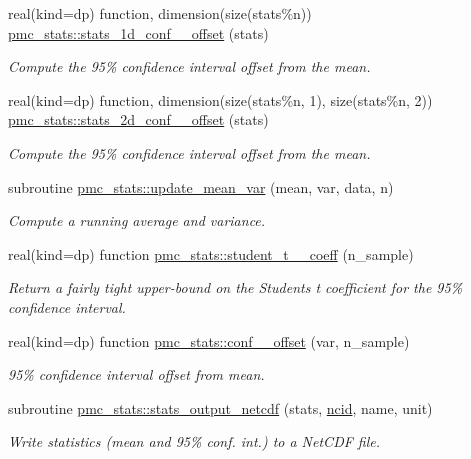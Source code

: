 \begin{DoxyCompactItemize}
real(kind=dp) function, dimension(size(stats\%n)) \mbox{\hyperlink{namespacepmc__stats_abb0f22506fbe1564d5dfe9b348967e3f}{pmc\+\_\+stats\+::stats\+\_\+1d\+\_\+conf\+\_\+\_\+offset}} (stats)
\begin{DoxyCompactList}\small\item\em Compute the 95\% confidence interval offset from the mean. \end{DoxyCompactList}\item 
real(kind=dp) function, dimension(size(stats\%n, 1), size(stats\%n, 2)) \mbox{\hyperlink{namespacepmc__stats_a4b54545fdbc6ea7302c947217f65a3cf}{pmc\+\_\+stats\+::stats\+\_\+2d\+\_\+conf\+\_\+\_\+offset}} (stats)
\begin{DoxyCompactList}\small\item\em Compute the 95\% confidence interval offset from the mean. \end{DoxyCompactList}\item 
subroutine \mbox{\hyperlink{namespacepmc__stats_a03fc23e0f58ef39a98b3fab675f7ec2f}{pmc\+\_\+stats\+::update\+\_\+mean\+\_\+var}} (mean, var, data, n)
\begin{DoxyCompactList}\small\item\em Compute a running average and variance. \end{DoxyCompactList}\item 
real(kind=dp) function \mbox{\hyperlink{namespacepmc__stats_a60b9373973781e467921c5e7558a57f9}{pmc\+\_\+stats\+::student\+\_\+t\+\_\+\_\+coeff}} (n\+\_\+sample)
\begin{DoxyCompactList}\small\item\em Return a fairly tight upper-\/bound on the Student\textquotesingle{}s t coefficient for the 95\% confidence interval. \end{DoxyCompactList}\item 
real(kind=dp) function \mbox{\hyperlink{namespacepmc__stats_a4ef20f4ac022e62933d3ed80e4041b88}{pmc\+\_\+stats\+::conf\+\_\+\_\+offset}} (var, n\+\_\+sample)
\begin{DoxyCompactList}\small\item\em 95\% confidence interval offset from mean. \end{DoxyCompactList}\item 
subroutine \mbox{\hyperlink{namespacepmc__stats_a7bd7c2f154323bb763f7bfa0f6e6f9a1}{pmc\+\_\+stats\+::stats\+\_\+output\+\_\+netcdf}} (stats, \mbox{\hyperlink{fractal_8_f90_a4e89f3f850921ff84a6dfce8b166ad50}{ncid}}, name, unit)
\begin{DoxyCompactList}\small\item\em Write statistics (mean and 95\% conf. int.) to a Net\+C\+DF file. \end{DoxyCompactList}\item 

\end{DoxyCompactItemize}
